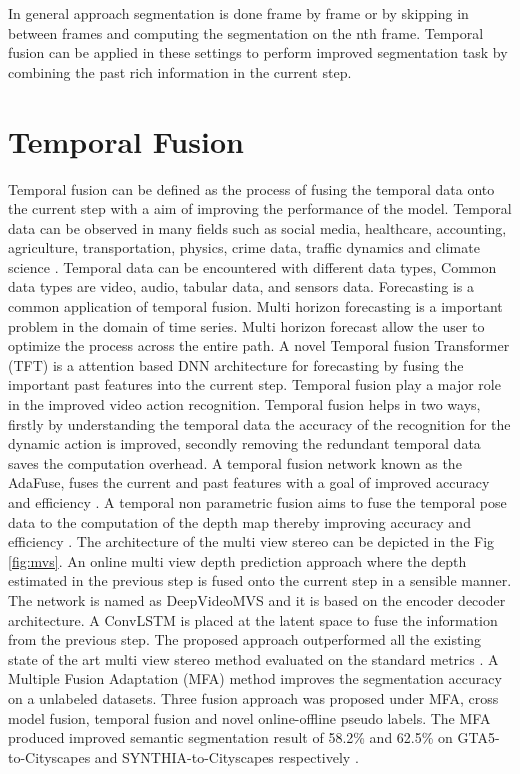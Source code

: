     In general approach segmentation is done frame by frame or by skipping in between frames and computing the segmentation on the nth frame. Temporal fusion can be applied in these settings to perform improved segmentation task by combining the past rich information in the current step. 
     
    \section{Temporal Fusion}
    \label{sec:tempfuse}
    
	Temporal fusion can be defined as the process of fusing the temporal data onto the current step with a aim of improving the performance of the model. Temporal data can be observed in many fields such as social media, healthcare, accounting, agriculture, transportation, physics, crime data, traffic dynamics and climate science \cite{49_atluri2018spatio}. Temporal data can be encountered with different data types, Common data types are video, audio, tabular data, and sensors data. Forecasting is a common application of temporal fusion. Multi horizon forecasting is a important problem in the domain of time series. Multi horizon forecast allow the user to optimize the process across the entire path. A novel Temporal fusion Transformer (TFT) \cite{50_lim2021temporal} is a attention based DNN architecture for forecasting by fusing the important past features into the current step. Temporal fusion play a major role in the improved video action recognition. Temporal fusion helps in two ways, firstly by understanding the temporal data the accuracy of the recognition for the dynamic action is improved, secondly removing the redundant temporal data saves the computation overhead. A temporal fusion network known as the AdaFuse, fuses the current and past features with a goal of improved accuracy and efficiency \cite{51_meng2021adafuse}. A temporal non parametric fusion aims to fuse the 
	temporal pose data to the computation of the depth map thereby improving accuracy and efficiency \cite{52_hou2019multi}. The architecture of the multi view stereo can be depicted in the Fig \ref{fig:mvs}. An online multi view depth prediction approach where the depth estimated in the previous step is fused onto the current step in a sensible manner. The network is named as DeepVideoMVS and it is based on the encoder decoder architecture. A ConvLSTM is placed at the latent space to fuse the information from the previous step. The proposed approach outperformed all the existing state of the art multi view stereo method evaluated on the standard metrics \cite{53_duzceker2021deepvideomvs}. 
	A Multiple Fusion Adaptation (MFA) method improves the segmentation accuracy on a unlabeled datasets. Three fusion approach was proposed under MFA, cross model fusion, temporal fusion and novel online-offline pseudo labels. The MFA produced improved semantic segmentation result of 58.2\% and 62.5\% on GTA5-to-Cityscapes and SYNTHIA-to-Cityscapes respectively \cite{54_zhang2021multiple}.  
    
